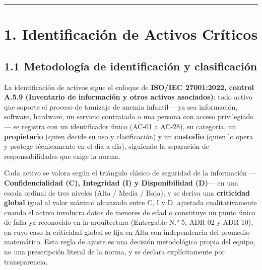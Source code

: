 \documentclass[11pt,a4paper]{article}
\begin{document}
\begin{center}\rule{0.5\linewidth}{0.5pt}\end{center}

\section{1. Identificación de Activos Críticos}\label{identificaciuxf3n-de-activos-cruxedticos}

\subsection{1.1 Metodología de identificación y clasificación}\label{metodologuxeda-de-identificaciuxf3n-y-clasificaciuxf3n}

La identificación de activos sigue el enfoque de \textbf{ISO/IEC 27001:2022, control A.5.9 (Inventario de información y otros activos asociados)}: todo activo que soporte el proceso de tamizaje de anemia infantil ---ya sea información, software, hardware, un servicio contratado o una persona con acceso privilegiado--- se registra con un identificador único (AC-01 a AC-28), su categoría, un \textbf{propietario} (quien decide su uso y clasificación) y un \textbf{custodio} (quien lo opera y protege técnicamente en el día a día), siguiendo la separación de responsabilidades que exige la norma.

Cada activo se valora según el triángulo clásico de seguridad de la información ---\textbf{Confidencialidad (C), Integridad (I) y Disponibilidad (D)}--- en una escala ordinal de tres niveles (Alta / Media / Baja), y se deriva una \textbf{criticidad global} igual al valor máximo alcanzado entre C, I y D, ajustada cualitativamente cuando el activo involucra datos de menores de edad o constituye un punto único de falla ya reconocido en la arquitectura (Entregable N.° 5, ADR-02 y ADR-10), en cuyo caso la criticidad global se fija en Alta con independencia del promedio matemático. Esta regla de ajuste es una decisión metodológica propia del equipo, no una prescripción literal de la norma, y se declara explícitamente por transparencia.
\end{document}

